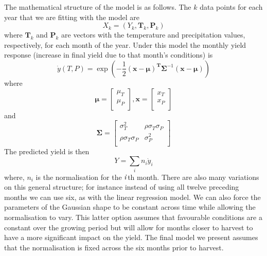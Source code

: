 \documentclass[12pt]{article}
\begin{document}
The mathematical structure of the model is as follows. The $k$ data points for each year that we are fitting with the model are 
\begin{equation}
X_k = (Y_k, \mathbf T_k,  \mathbf P_k)
\end{equation}
where $\mathbf T_k$ and $\mathbf P_k$ are vectors with the temperature and precipitation values, respectively, for each month of the year. Under this model the monthly yield response (increase in final yield due to that month's conditions) is
\begin{equation}
\dot{y}(T,P) =  \exp\left(-\frac{1}{2} ({\mathbf x}-{\mathbf \mu})^{\mathbf T} {\mathbf \Sigma}^{-1}  ({\mathbf x}-{\mathbf \mu})\right)
\end{equation}
where
\begin{equation}
{\mathbf \mu} =  \left[ {\begin{array}{c}
   \mu_T \\
   \mu_P \\
  \end{array} } \right],{\mathbf x} =  \left[ {\begin{array}{c}
   x_T \\
   x_P \\
  \end{array} } \right]
\end{equation}
and
\begin{equation}
\label{eqn:2d_gaussian_sigma}
    \mathbf\Sigma = \left[ {\begin{array}{cc}
    \sigma_T^2 & \rho \sigma_T \sigma_P \\
    \rho \sigma_T \sigma_P  & \sigma_P^2 \\
    \end{array} } \right]
\end{equation}
The predicted yield is then
\begin{equation}
\label{eqn:yield_sum}
Y = \sum_i n_i \dot{y}_i
\end{equation}
where, $n_i$ is the normalisation for the $\it{i}$th month. There are also many variations on this general structure; for instance instead of using all twelve preceding months we can use six, as with the linear regression model. We can also force the parameters of the Gaussian shape to be constant across time while allowing the normalisation to vary. This latter option assumes that favourable conditions are a constant over the growing period but will allow for months closer to harvest to have a more significant impact on the yield. The final model we present assumes that the normalisation is fixed across the six months prior to harvest.
\end{document}
